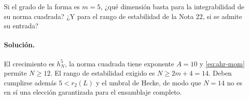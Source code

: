 \begin{ejercicio}
Si el grado de la forma es $m=5$, ¿qué dimensión basta para la integrabilidad de su norma cuadrada? ¿Y para el rango de estabilidad de la Nota 22, si se admite su entrada?
\end{ejercicio}
\paragraph{Solución.} El crecimiento es $h_N^5$, la norma cuadrada tiene exponente $A=10$ y \eqref{eq:ahr-mom} permite $N\ge12$. El rango de estabilidad exigido es $N\ge2m+4=14$. Deben cumplirse además $5<r_2(L)$ y el umbral de Hecke, de modo que $N=14$ no es en sí una elección garantizada para el ensamblaje completo.
